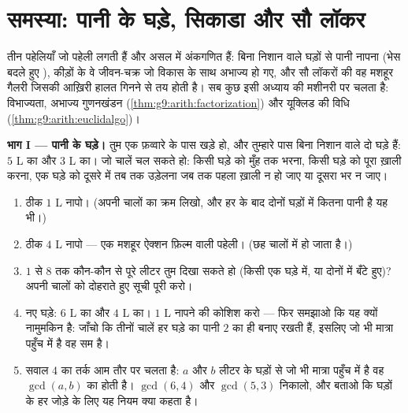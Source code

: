 \section{समस्या: पानी के घड़े, सिकाडा और सौ लॉकर}

\begin{problem}
\label{pb:g9:arith:1}
तीन पहेलियाँ जो पहेली लगती हैं और असल में अंकगणित हैं: बिना निशान
वाले घड़ों से पानी नापना (भेस बदले हुए ), कीड़ों के वे
जीवन-चक्र जो विकास के साथ अभाज्य हो गए, और सौ लॉकरों की वह मशहूर
गैलरी जिसकी आख़िरी हालत  गिनने से तय होती है। सब कुछ इसी अध्याय की
मशीनरी पर चलता है: विभाज्यता, अभाज्य गुणनखंडन
(\cref{thm:g9:arith:factorization}) और यूक्लिड की विधि
(\cref{thm:g9:arith:euclidalgo})।

\medskip
\noindent\textbf{भाग I --- पानी के घड़े।}
तुम एक फ़व्वारे के पास खड़े हो, और तुम्हारे पास बिना निशान वाले दो घड़े
हैं: $5$ L का और $3$ L का। जो चालें चल सकते हो: किसी घड़े को मुँह तक
भरना, किसी घड़े को पूरा ख़ाली करना, एक घड़े को दूसरे में तब तक उड़ेलना
जब तक पहला ख़ाली न हो जाए या दूसरा भर न जाए।
\begin{enumerate}
  \item ठीक $1$ L नापो। (अपनी चालों का क्रम लिखो, और हर  के बाद
        दोनों घड़ों में कितना पानी है यह भी।)
  \item ठीक $4$ L नापो --- एक मशहूर ऐक्शन फ़िल्म वाली पहेली। (छह
        चालों में हो जाता है।)
  \item $1$ से $8$ तक कौन-कौन से पूरे लीटर तुम दिखा सकते हो (किसी एक
        घड़े में, या दोनों में बँटे हुए)? अपनी चालों को दोहराते हुए
        सूची पूरी करो।
  \item नए घड़े: $6$ L का और $4$ L का। $1$ L नापने की कोशिश करो ---
        फिर समझाओ कि यह क्यों नामुमकिन है: जाँचो कि तीनों चालें हर
        घड़े का पानी $2$ का  ही बनाए रखती हैं, इसलिए जो भी मात्रा
        पहुँच में है वह सम है।
  \item सवाल 4 का तर्क आम तौर पर चलता है: $a$ और $b$ लीटर के घड़ों से
        जो भी मात्रा पहुँच में है वह $\gcd(a, b)$ का  होती है।
        $\gcd(6, 4)$ और $\gcd(5, 3)$ निकालो, और बताओ कि घड़ों के हर
        जोड़े के लिए यह नियम क्या कहता है।
\end{enumerate}


\end{problem}
